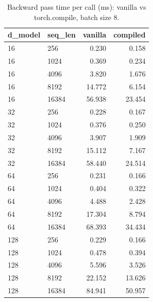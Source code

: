 \begin{table}
\centering
\begin{tabular}{llrr}
\toprule
d\_model & seq\_len & vanilla & compiled \\
\midrule
16 & 256 & 0.230 & 0.158 \\
16 & 1024 & 0.369 & 0.234 \\
16 & 4096 & 3.820 & 1.676 \\
16 & 8192 & 14.772 & 6.154 \\
16 & 16384 & 56.938 & 23.454 \\
32 & 256 & 0.228 & 0.167 \\
32 & 1024 & 0.376 & 0.250 \\
32 & 4096 & 3.907 & 1.909 \\
32 & 8192 & 15.112 & 7.167 \\
32 & 16384 & 58.440 & 24.514 \\
64 & 256 & 0.231 & 0.166 \\
64 & 1024 & 0.404 & 0.322 \\
64 & 4096 & 4.488 & 2.428 \\
64 & 8192 & 17.304 & 8.794 \\
64 & 16384 & 68.393 & 34.434 \\
128 & 256 & 0.229 & 0.166 \\
128 & 1024 & 0.478 & 0.394 \\
128 & 4096 & 5.596 & 3.526 \\
128 & 8192 & 22.152 & 13.626 \\
128 & 16384 & 84.941 & 50.957 \\
\bottomrule
\end{tabular}
\caption{Backward pass time per call (ms): vanilla vs torch.compile, batch size 8.}
\label{tab:attn_backward_compare}
\end{table}
